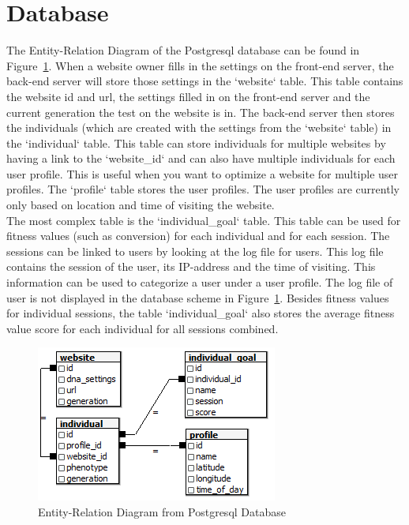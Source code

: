 \documentclass{report}
\begin{document}
\section{Database}
The Entity-Relation Diagram of the Postgresql database can be found in Figure~\ref{fig:erd}. When a website owner fills in the settings on the front-end server, the back-end server will store those settings in the `website` table. This table contains the website id and url, the settings filled in on the front-end server and the current generation the test on the website is in. The back-end server then stores the individuals (which are created with the settings from the `website` table) in the `individual` table. This table can store individuals for multiple websites by having a link to the `website\_id` and can also have multiple individuals for each user profile. This is useful when you want to optimize a website for multiple user profiles. The `profile` table stores the user profiles. The user profiles are currently only based on location and time of visiting the website.\\

The most complex table is the `individual\_goal` table. This table can be used for fitness values (such as conversion) for each individual and for each session. The sessions can be linked to users by looking at the log file for users. This log file contains the session of the user, its IP-address and the time of visiting. This information can be used to categorize a user under a user profile. The log file of user is not displayed in the database scheme in Figure~\ref{fig:erd}. Besides fitness values for individual sessions, the table `individual\_goal` also stores the average fitness value score for each individual for all sessions combined. \\

\begin{figure}[ht]
	\centering
	\includegraphics[width=0.6\linewidth]{imgs/erd.PNG}
	\caption{Entity-Relation Diagram from Postgresql Database}
	\label{fig:erd}
\end{figure}
\FloatBarrier
\end{document}
